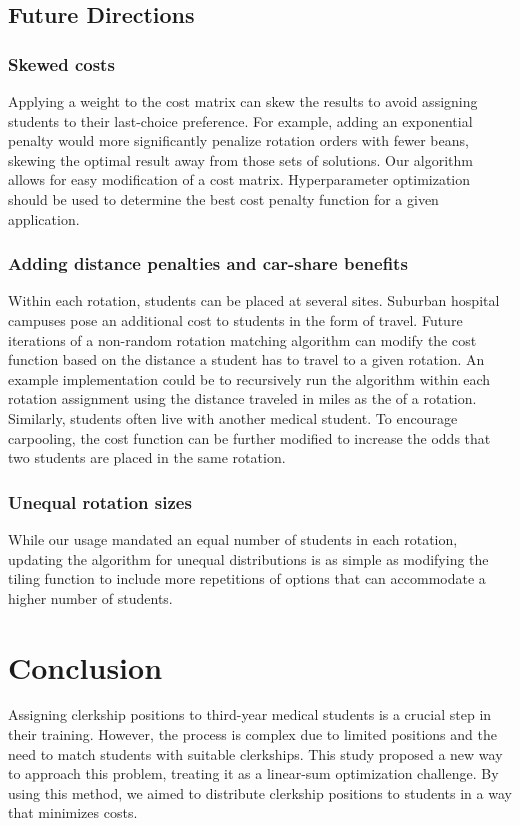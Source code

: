\documentclass{article}
\begin{document}
\subsection{Future Directions}
\subsubsection{Skewed costs}
Applying a weight to the cost matrix can skew the results to avoid assigning students to their last-choice preference. For example, adding an exponential penalty would more significantly penalize rotation orders with fewer beans, skewing the optimal result away from those sets of solutions. Our algorithm allows for easy modification of a cost matrix. Hyperparameter optimization should be used to determine the best cost penalty function for a given application. 

\subsubsection{Adding distance penalties and car-share benefits}
Within each rotation, students can be placed at several sites. Suburban hospital campuses pose an additional cost to students in the form of travel. Future iterations of a non-random rotation matching algorithm can modify the cost function based on the distance a student has to travel to a given rotation. An example implementation could be to recursively run the algorithm within each rotation assignment using the distance traveled in miles as the of a rotation.
Similarly, students often live with another medical student. To encourage carpooling, the cost function can be further modified to increase the odds that two students are placed in the same rotation.

\subsubsection{Unequal rotation sizes}
While our usage mandated an equal number of students in each rotation, updating the algorithm for unequal distributions is as simple as modifying the tiling function to include more repetitions of options that can accommodate a higher number of students. 

\section{Conclusion}
Assigning clerkship positions to third-year medical students is a crucial step in their training. However, the process is complex due to limited positions and the need to match students with suitable clerkships. This study proposed a new way to approach this problem, treating it as a linear-sum optimization challenge. By using this method, we aimed to distribute clerkship positions to students in a way that minimizes costs.
\end{document}

